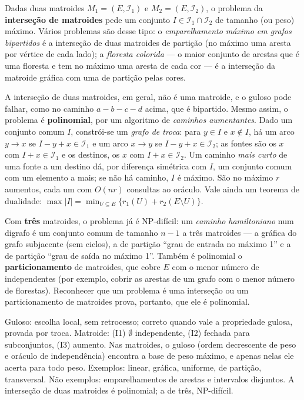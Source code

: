 \begin{complemento}
Dadas duas matroides $M_1=(E,\mathcal I_1)$ e $M_2=(E,\mathcal I_2)$, o problema da \textbf{interseção de matroides} pede um conjunto $I\in\mathcal I_1\cap\mathcal I_2$ de tamanho (ou peso) máximo. Vários problemas são desse tipo: o \emph{emparelhamento máximo em grafos bipartidos} é a interseção de duas matroides de partição (no máximo uma aresta por vértice de cada lado); a \emph{floresta colorida} --- o maior conjunto de arestas que é uma floresta e tem no máximo uma aresta de cada cor --- é a interseção da matroide gráfica com uma de partição pelas cores.

A interseção de duas matroides, em geral, não é uma matroide, e o guloso pode falhar, como no caminho $a\!-\!b\!-\!c\!-\!d$ acima, que é bipartido. Mesmo assim, o problema é \textbf{polinomial}, por um algoritmo de \emph{caminhos aumentantes}. Dado um conjunto comum $I$, constrói-se um \emph{grafo de troca}: para $y\in I$ e $x\notin I$, há um arco $y\to x$ se $I-y+x\in\mathcal I_1$ e um arco $x\to y$ se $I-y+x\in\mathcal I_2$; as fontes são os $x$ com $I+x\in\mathcal I_1$ e os destinos, os $x$ com $I+x\in\mathcal I_2$. Um caminho \emph{mais curto} de uma fonte a um destino dá, por diferença simétrica com $I$, um conjunto comum com um elemento a mais; se não há caminho, $I$ é máximo. São no máximo $r$ aumentos, cada um com $O(nr)$ consultas ao oráculo. Vale ainda um teorema de dualidade: $\max|I|=\min_{U\subseteq E}\{r_1(U)+r_2(E\setminus U)\}$.

Com \textbf{três} matroides, o problema já é NP-difícil: um \emph{caminho hamiltoniano} num digrafo é um conjunto comum de tamanho $n-1$ a três matroides --- a gráfica do grafo subjacente (sem ciclos), a de partição ``grau de entrada no máximo 1'' e a de partição ``grau de saída no máximo 1''. Também é polinomial o \textbf{particionamento} de matroides, que cobre $E$ com o menor número de independentes (por exemplo, cobrir as arestas de um grafo com o menor número de florestas). Reconhecer que um problema é uma interseção ou um particionamento de matroides prova, portanto, que ele é polinomial.
\end{complemento}

\begin{chave}
Guloso: escolha local, sem retrocesso; correto quando vale a propriedade gulosa, provada por troca. Matroide: (I1) $\emptyset$ independente, (I2) fechada para subconjuntos, (I3) aumento. Nas matroides, o guloso (ordem decrescente de peso e oráculo de independência) encontra a base de peso máximo, e apenas nelas ele acerta para todo peso. Exemplos: linear, gráfica, uniforme, de partição, transversal. Não exemplos: emparelhamentos de arestas e intervalos disjuntos. A interseção de duas matroides é polinomial; a de três, NP-difícil.
\end{chave}

